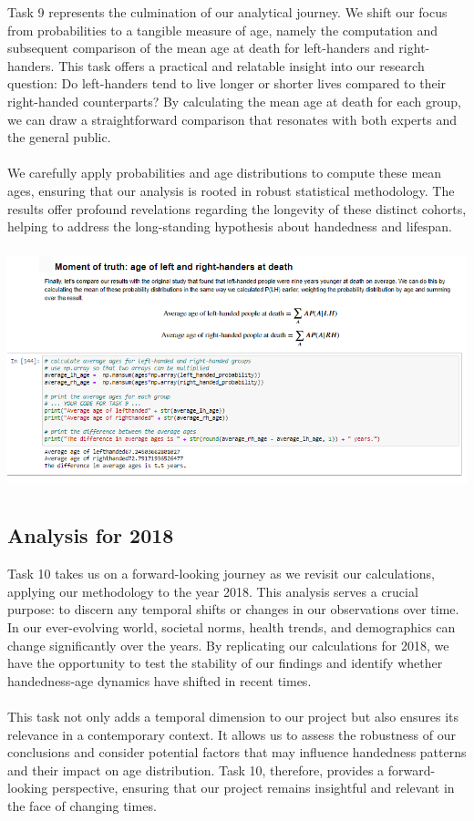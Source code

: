 \documentclass{article}
\begin{document}
Task 9 represents the culmination of our analytical journey. We shift our focus from probabilities to a tangible measure of age, namely the computation and subsequent comparison of the mean age at death for left-handers and right-handers. This task offers a practical and relatable insight into our research question: Do left-handers tend to live longer or shorter lives compared to their right-handed counterparts? By calculating the mean age at death for each group, we can draw a straightforward comparison that resonates with both experts and the general public.\\ \\We carefully apply probabilities and age distributions to compute these mean ages, ensuring that our analysis is rooted in robust statistical methodology. The results offer profound revelations regarding the longevity of these distinct cohorts, helping to address the long-standing hypothesis about handedness and lifespan.

\vspace{0.5cm}

        \begin{center}
            \includegraphics[height=200pt]{9.png}\\
        \end{center}

\subsection{Analysis for 2018}

Task 10 takes us on a forward-looking journey as we revisit our calculations, applying our methodology to the year 2018. This analysis serves a crucial purpose: to discern any temporal shifts or changes in our observations over time. In our ever-evolving world, societal norms, health trends, and demographics can change significantly over the years. By replicating our calculations for 2018, we have the opportunity to test the stability of our findings and identify whether handedness-age dynamics have shifted in recent times.\\ \\This task not only adds a temporal dimension to our project but also ensures its relevance in a contemporary context. It allows us to assess the robustness of our conclusions and consider potential factors that may influence handedness patterns and their impact on age distribution. Task 10, therefore, provides a forward-looking perspective, ensuring that our project remains insightful and relevant in the face of changing times.
\end{document}
